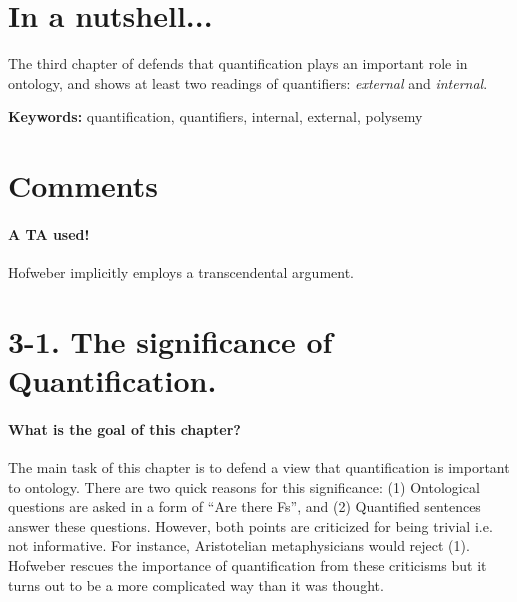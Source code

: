 \documentclass[
10pt, %
a4paper, %
twocolumn, %
landscape %
]{article}
\begin{document}
\pagestyle{myheadings} %
\markright{\doctitle} %


\thispagestyle{plain} %

\printtitle %


\section*{In a nutshell... }
The third chapter of \cite{Hofweber2016_OntologyAmbitions}
	defends that quantification plays an important role in ontology, and
	shows at least two readings of quantifiers: \emph{external} and \emph{internal}.

\noindent \textbf{Keywords:}
quantification, quantifiers, internal, external, polysemy


\section*{Comments}
\paragraph{A TA used!}
Hofweber implicitly employs a transcendental argument.

\section*{3-1. The significance of Quantification.
}
\paragraph{What is the goal of this chapter?}
The main task of this chapter is to defend a view that
quantification is important to ontology.
There are two quick reasons for this significance:
(1) Ontological questions are asked in a form of ``Are there Fs'', and
(2) Quantified sentences answer these questions.
However, both points are criticized for being trivial i.e. not informative.
For instance, Aristotelian metaphysicians would reject (1).
Hofweber rescues the importance of quantification from these criticisms
but it turns out to be a more complicated way than it was thought.
\end{document}
